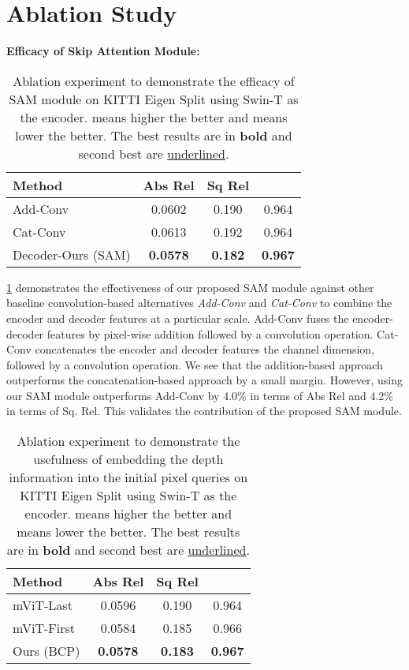 \documentclass[10pt,twocolumn,letterpaper]{article}
\newcommand{\myfirstpara}[1]{\par \noindent \textbf{#1:}}
\begin{document}
\section{Ablation Study}




\myfirstpara{Efficacy of Skip Attention Module}
\begin{table}[t]
\centering
\setlength{\tabcolsep}{8pt}
\begin{tabular}{lccc}
\toprule
Method &  Abs Rel{} & Sq Rel{} & {{}{}} \\
\midrule
Add-Conv  &  0.0602 & 0.190 & 0.964  \\
Cat-Conv & 0.0613 & 0.192 &  0.964 \\
\midrule
Decoder-Ours (SAM) & \textbf{0.0578} & \textbf{0.182}  & \textbf{0.967}  \\
\bottomrule
\end{tabular}
\caption{Ablation experiment to demonstrate the efficacy of SAM module on KITTI Eigen Split using Swin-T as the encoder.  means higher the better and  means lower the better. The best results are in \textbf{bold} and second best are \underline{underlined}. }
\label{tab:abl_sam}
\end{table} \cref{tab:abl_sam} demonstrates the effectiveness of our proposed SAM module against other baseline convolution-based alternatives \emph{Add-Conv}  and \emph{Cat-Conv} to combine the encoder and decoder features at a particular scale. Add-Conv fuses the encoder-decoder features by pixel-wise addition followed by a convolution operation. Cat-Conv concatenates the encoder and decoder features \wrt the channel dimension, followed by a convolution operation. We see that the addition-based approach outperforms the concatenation-based approach by a small margin. However, using our SAM module outperforms  Add-Conv by 4.0\% in terms of Abs Rel and 4.2\% in terms of Sq. Rel. This validates the contribution of the proposed SAM module. 









\begin{table}[t]
\centering
\setlength{\tabcolsep}{12pt}
\begin{tabular}{lccc}
\toprule
Method &  Abs Rel{} & Sq Rel{} & {{}{}} \\
\midrule
mViT-Last  & 0.0596 & 0.190  & 0.964\\
mViT-First & 0.0584 & 0.185 &  0.966 \\
\midrule
Ours (BCP) & \textbf{0.0578} & \textbf{0.183}  & \textbf{0.967} \\
\bottomrule
\end{tabular}
\caption{Ablation experiment to demonstrate the usefulness of embedding the depth information into the initial pixel queries on KITTI Eigen Split using Swin-T as the encoder.  means higher the better and  means lower the better. The best results are in \textbf{bold} and second best are \underline{underlined}.}
\label{tab:abl_bcp}
\end{table}
\end{document}
